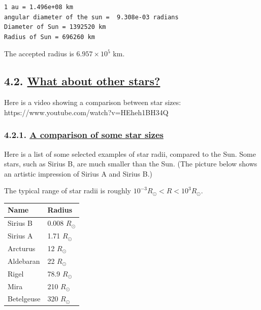 \documentclass[
  letterpaper,
  DIV=11,
  numbers=noendperiod]{scrartcl}
\begin{document}
\begin{verbatim}
1 au = 1.496e+08 km
angular diameter of the sun =  9.308e-03 radians
Diameter of Sun = 1392520 km
Radius of Sun = 696260 km
\end{verbatim}

The accepted radius is \(6.957\times 10^5\) km.

\hypertarget{what-about-other-stars}{%
\subsection{\texorpdfstring{4.2. \protect\hyperlink{toc0_}{What about
other
stars?}}{4.2. What about other stars?}}\label{what-about-other-stars}}

Here is a video showing a comparison between star sizes:
https://www.youtube.com/watch?v=HEheh1BH34Q

\hypertarget{a-comparison-of-some-star-sizes}{%
\subsubsection{\texorpdfstring{4.2.1. \protect\hyperlink{toc0_}{A
comparison of some star
sizes}}{4.2.1. A comparison of some star sizes}}\label{a-comparison-of-some-star-sizes}}

Here is a list of some selected examples of star radii, compared to the
Sun. Some stars, such as Sirius B, are much smaller than the Sun. (The
picture below shows an artistic impression of Sirius A and Sirius B.)

The typical range of star radii is roughly
\(10^{-3}R_\odot < R < 10^3 R_\odot\).

\begin{longtable}[]{@{}ll@{}}
\toprule\noalign{}
Name & Radius \\
\midrule\noalign{}
\endhead
\bottomrule\noalign{}
\endlastfoot
Sirius B & 0.008 \(R_\odot\) \\
Sirius A & 1.71 \(R_\odot\) \\
Arcturus & 12 \(R_\odot\) \\
Aldebaran & 22 \(R_\odot\) \\
Rigel & 78.9 \(R_\odot\) \\
Mira & 210 \(R_\odot\) \\
Betelgeuse & 320 \(R_\odot\) \\
\end{longtable}
\end{document}
